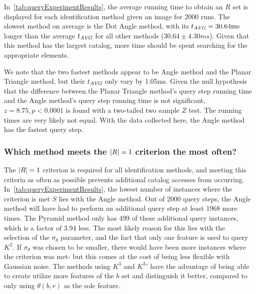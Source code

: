 In~\autoref{tab:queryExperimentResults}, the average running time to obtain an $R$ set is displayed for each
identification method given an image for 2000 runs.
The slowest method on average is the Dot Angle method, with its $t_{\AVG} = 30.64 \si{ms}$ longer than the average
$t_{\AVG}$ for all other methods ($30.64 \pm 4.30 \si{ms}$).
Given that this method has the largest catalog, more time should be spent searching for the appropriate elements.

We note that the two fastest methods appear to be Angle method and the Planar Triangle method, but their $t_\AVG$ only
vary by 1.05ms.
Given the null hypothesis that the difference between the Planar Triangle method's query step running time and the
Angle method's query step running time is not significant, $z = 8.75, p < 0.0001$ is found with a two-tailed two
sample $Z$ test.
The running times are very likely not equal.
With the data collected here, the Angle method has the fastest query step.

\subsubsection{Which method meets the $\abs{R} = 1$ criterion the most often?}
The $\abs{R} = 1$ criterion is required for all identification methods, and meeting this criteria as often as possible
prevents additional catalog accesses from occurring.
In~\autoref{tab:queryExperimentResults}, the lowest number of instances where the criterion is met $S$ lies with the
Angle method.
Out of 2000 query steps, the Angle method will have had to perform an additional query step at least 1968 more times.
The Pyramid method only has 499 of these additional query instances, which is a factor of 3.94 less.
The most likely reason for this lies with the selection of the $\sigma_\theta$ parameter, and the fact that only one
feature is used to query $K^2$.
If $\sigma_\theta$ was chosen to be smaller, there would have been more instances where the criterion was met- but
this comes at the cost of being less flexible with Gaussian noise.
The methods using $K^3$ and $K^3'$ have the advantage of being able to create utilize more features of the $b$ set and
distinguish it better, compared to only using $\theta(b, r)$ as the sole feature.

